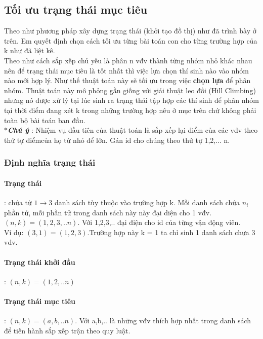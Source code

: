 \documentclass[13pt,a4paper]{article}
\begin{document}
\subsection{Tối ưu trạng thái mục tiêu}
Theo như phương pháp xây dựng trạng thái (khởi tạo đồ thị) như đã trình bày ở trên. Em quyết định chọn cách tối ưu từng bài toán con cho từng trường hợp của k như đã liệt kê.\\
Theo như cách sắp xếp chủ yếu là phân n vđv thành từng nhóm nhỏ khác nhau nên để trạng thái mục tiêu là tốt nhất thì việc lựa chọn thí sinh nào vào nhóm nào mới hợp lý. Như thế thuật toán này sẽ tối ưu trong việc \textbf{chọn lựa} để phân nhóm. Thuật toán này mô phỏng gần giống với giải thuật leo đồi (Hill Climbing) nhưng nó được xử lý tại lúc sinh ra trạng thái tập hợp các thí sinh để phân nhóm tại thời điểm đang xét k trong những trường hợp nêu ở mục trên chứ không phải toàn bộ bài toán ban đầu.\\
$\ast$\textbf{\textit{Chú ý}} : Nhiệm vụ đầu tiên của thuật toán là sắp xếp lại điểm của các vđv theo thứ tự điểmcủa họ từ nhỏ để lớn. Gán id cho chúng theo thứ tự 1,2,... n.
\subsubsection{Định nghĩa trạng thái}
\paragraph{Trạng thái}: chứa từ $1 \rightarrow 3$ danh sách tùy thuộc vào trường hợp k. Mỗi danh sách chứa $n_i$ phần tử, mỗi phần tử trong danh sách này này đại diện cho 1 vđv.\\
$(n,k) = ( 1, 2, 3,..n )$. Với 1,2,3,.. đại điện cho id của từng vận động viên.\\
Ví dụ: $(3, 1)= ( 1,2,3 )$.Trường hợp này k = 1 ta chỉ sinh 1 danh sách chưa 3 vđv.
\paragraph{Trạng thái khởi đầu}: $(n,k)= ( 1,2,..n )$

\paragraph{Trạng thái mục tiêu}: $(n,k)= ( a,b,..n )$. Với a,b,.. là những vđv thích hợp nhất trong danh sách để tiến hành sắp xếp trận theo quy luật. 
\end{document}
